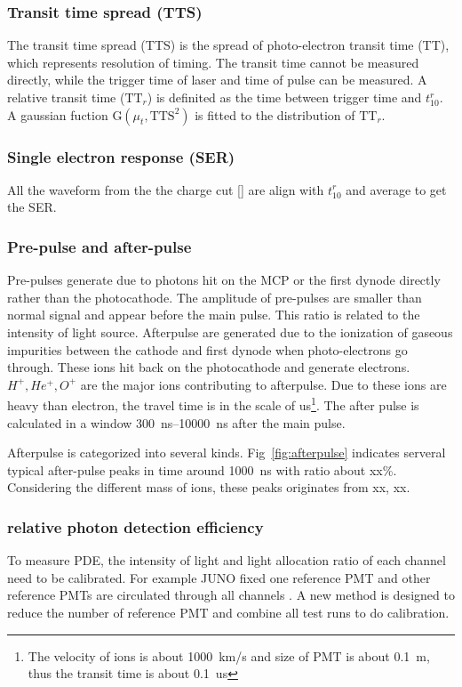 \subsubsection{Transit time spread (TTS)}
The transit time spread (TTS) is the spread of photo-electron transit time (TT), which represents resolution of timing. The transit time cannot be measured directly, while the trigger time of laser and time of pulse can be measured. A relative transit time ($\mathrm{TT}_r$) is definited as the time between trigger time and $t_{10}^r$. A gaussian fuction G$(\mu_t,\mathrm{TTS}^2)$ is fitted to the distribution of $\mathrm{TT}_r$.
\subsubsection{Single electron response (SER)}
All the waveform from the the charge cut [] are align with $t_{10}^r$ and average to get the SER.
\subsubsection{Pre-pulse and after-pulse}
Pre-pulses generate due to photons hit on the MCP or the first dynode directly rather than the photocathode\cite{JUNOMassTesting}. The amplitude of pre-pulses are smaller than normal signal and appear before the main pulse. This ratio is related to the intensity of light source.
Afterpulse are generated due to the ionization of gaseous impurities between the cathode and first dynode when photo-electrons go through\cite{Coates_1973}. These ions hit back on the photocathode and generate electrons. $H^+,He^+,O^+$ are the major ions contributing to afterpulse\cite{Coates_1973}. Due to these ions are heavy than electron, the travel time is in the scale of \si{us}\footnote{The velocity of ions is about \SI{1000}{km/s} and size of PMT is about \SI{0.1}{m}, thus the transit time is about \SI{0.1}{us}}. The after pulse is calculated in a window \SIrange{300}{10000}{ns} after the main pulse.


Afterpulse is categorized into several kinds. Fig~\ref{fig:afterpulse} indicates serveral typical after-pulse peaks in time around \SI{1000}{ns} with ratio about xx\%. Considering the different mass of ions, these peaks originates from xx, xx.
\subsubsection{relative photon detection efficiency}
To measure PDE, the intensity of light and light allocation ratio of each channel need to be calibrated. For example JUNO fixed one reference PMT and other reference PMTs are circulated through all channels \cite{Wonsak_2021}. A new method is designed to reduce the number of reference PMT and combine all test runs to do calibration.  

